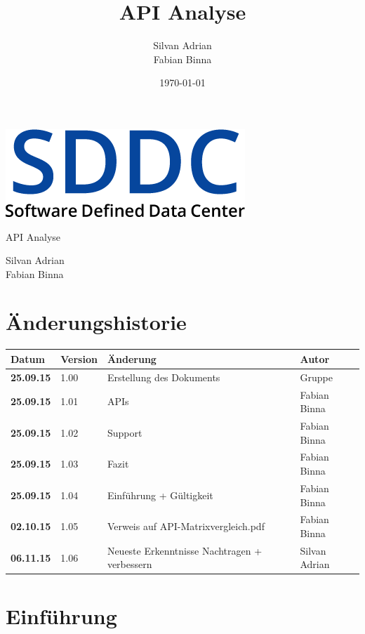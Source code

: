 \documentclass[11pt]{scrartcl}
\title{API Analyse}
\author{Silvan Adrian \\ Fabian Binna}
\date{\today{}}
\begin{document}
\def\arraystretch{1.5}
\begin{titlepage}
\begin{center}
\vspace{10em}
\includegraphics[scale=2]{SDDC}
\vspace{10em}
\end{center}
\begin{center}
\huge {API Analyse}
\end{center}
\begin{center}
\vspace{10em}
\LARGE {Silvan Adrian} \\
\LARGE {Fabian Binna}
\end{center}

\end{titlepage}

\newpage
\section{Änderungshistorie}
\begin{tabularx}{\linewidth}{l l l l}
\textbf{Datum} & \textbf{Version} & \textbf{Änderung}  & \textbf{Autor} \\
\hline
\textbf{25.09.15} & 1.00 & Erstellung des Dokuments & Gruppe \\
\textbf{25.09.15} & 1.01 & APIs & Fabian Binna\\
\textbf{25.09.15} & 1.02 & Support & Fabian Binna\\
\textbf{25.09.15} & 1.03 & Fazit & Fabian Binna\\
\textbf{25.09.15} & 1.04 & Einführung + Gültigkeit & Fabian Binna\\
\textbf{02.10.15} & 1.05 & Verweis auf API-Matrixvergleich.pdf & Fabian Binna\\
\textbf{06.11.15} & 1.06 & Neueste Erkenntnisse Nachtragen + verbessern & Silvan 
Adrian\\
\end{tabularx}

\newpage
\tableofcontents
\newpage

\section{Einführung}
\end{document}
